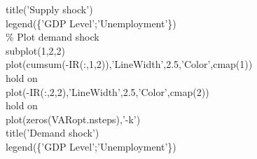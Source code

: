 \hspace{1mm}\hspace{5mm} \hspace{5mm} title(\textcolor{matlabpurple}{'Supply shock'}) \\ 
\hspace{1mm}\hspace{5mm} \hspace{5mm} legend(\{\textcolor{matlabpurple}{'GDP Level'};'Unemployment'\}) \\ 
\hspace{1mm}\hspace{5mm} \hspace{5mm} \textcolor{matlabgreen}{\% Plot demand shock }\\ 
\hspace{1mm}\hspace{5mm} \hspace{5mm} subplot(1,2,2) \\ 
\hspace{1mm}\hspace{5mm} \hspace{5mm} plot(cumsum(-IR(:,1,2)),\textcolor{matlabpurple}{'LineWidth'},2.5,\textcolor{matlabpurple}{'Color'},cmap(1)) \\ 
\hspace{1mm}\hspace{5mm} \hspace{5mm} hold on \\ 
\hspace{1mm}\hspace{5mm} \hspace{5mm} plot(-IR(:,2,2),\textcolor{matlabpurple}{'LineWidth'},2.5,\textcolor{matlabpurple}{'Color'},cmap(2)) \\ 
\hspace{1mm}\hspace{5mm} \hspace{5mm} hold on \\ 
\hspace{1mm}\hspace{5mm} \hspace{5mm} plot(zeros(VARopt.nsteps),\textcolor{matlabpurple}{'-k'}) \\ 
\hspace{1mm}\hspace{5mm} \hspace{5mm} title(\textcolor{matlabpurple}{'Demand shock'}) \\ 
\hspace{1mm}\hspace{5mm} \hspace{5mm} legend(\{\textcolor{matlabpurple}{'GDP Level'};'Unemployment'\}) \\ 
